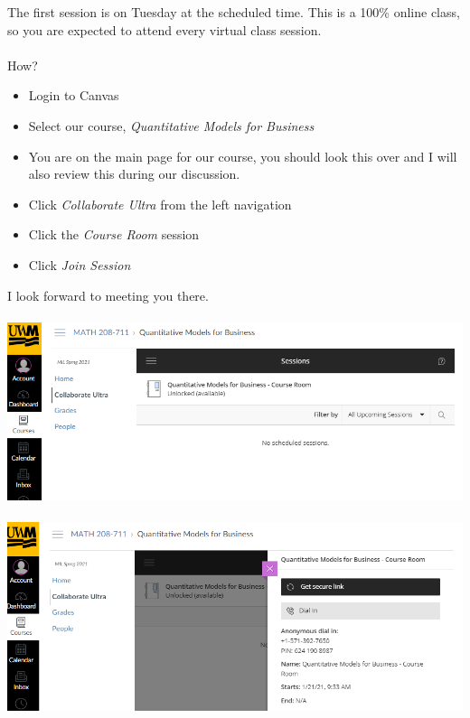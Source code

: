 \documentclass[]{article}
\begin{document}
The first session is on Tuesday at the scheduled time. This is a 100\% online class, so you are expected to attend every virtual class session.
\\\\
How?
\begin{itemize}
	\item Login to Canvas
	\item Select our course, \textit{Quantitative Models for Business}
	\item You are on the main page for our course, you should look this over and I will also review this during our discussion.
	\item Click \textit{Collaborate Ultra} from the left navigation
	\item Click the \textit{Course Room} session
	\item Click \textit{Join Session}	
\end{itemize}
I look forward to meeting you there.
\\\\
\includegraphics[width=1.0\linewidth]{an-01-1}
\\\\
\includegraphics[width=1.0\linewidth]{an-01-2}
\end{document}
